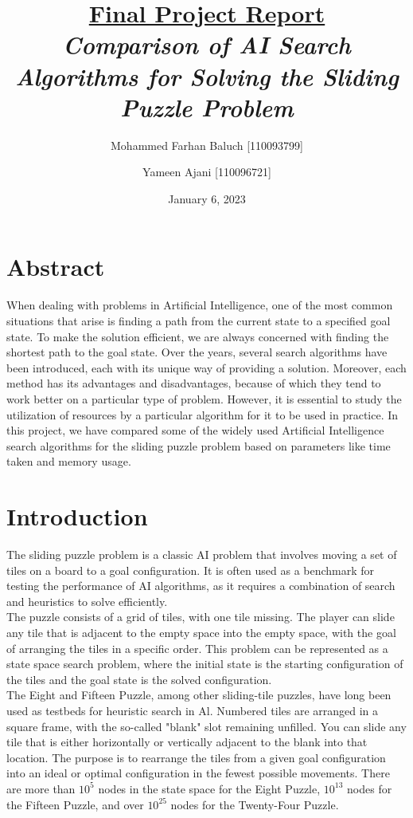 \documentclass[12pt]{article}
\title{ 
\textbf{ \underline {\Huge Final Project Report} } \\[2cm] 

\textbf{ \textit{\huge Comparison of AI Search Algorithms for Solving the Sliding Puzzle Problem} } \\[2cm]
}
\author{ \Large
Mohammed Farhan Baluch [110093799] \\
\and \Large
Yameen Ajani [110096721] \\[2cm]
}
\date{January 6, 2023}
\begin{document}
\maketitle
\pagebreak

\tableofcontents
\pagebreak

\section*{Abstract}
When dealing with problems in Artificial Intelligence, one of the most common situations that arise is finding a path from the current state to a specified goal state. To make the solution efficient, we are always concerned with finding the shortest path to the goal state. Over the years, several search algorithms have been introduced, each with its unique way of providing a solution. Moreover, each method has its advantages and disadvantages, because of which they tend to work better on a particular type of problem. However, it is essential to study the utilization of resources by a particular algorithm for it to be used in practice. In this project, we have compared some of the widely used Artificial Intelligence search algorithms for the sliding puzzle problem based on parameters like time taken and memory usage.

\section{Introduction}
The sliding puzzle problem is a classic AI problem that involves moving a set of tiles on a board to a goal configuration. It is often used as a benchmark for testing the performance of AI algorithms, as it requires a combination of search and heuristics to solve efficiently.\\

The puzzle consists of a grid of tiles, with one tile missing. The player can slide any tile that is adjacent to the empty space into the empty space, with the goal of arranging the tiles in a specific order. This problem can be represented as a state space search problem, where the initial state is the starting configuration of the tiles and the goal state is the solved configuration. \\

The Eight and Fifteen Puzzle, among other sliding-tile puzzles, have long been used as testbeds for heuristic search in Al. Numbered tiles are arranged in a square frame, with the so-called "blank" slot remaining unfilled. You can slide any tile that is either horizontally or vertically adjacent to the blank into that location. The purpose is to rearrange the tiles from a given goal configuration into an ideal or optimal configuration in the fewest possible movements. There are more than $10^5$ nodes in the state space for the Eight Puzzle, $10^{13}$ nodes for the Fifteen Puzzle, and over $10^{25}$ nodes for the Twenty-Four Puzzle. \\
\end{document}
